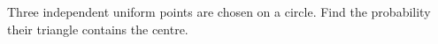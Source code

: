 Three independent uniform points are chosen on a circle. Find the probability their triangle contains the centre.

